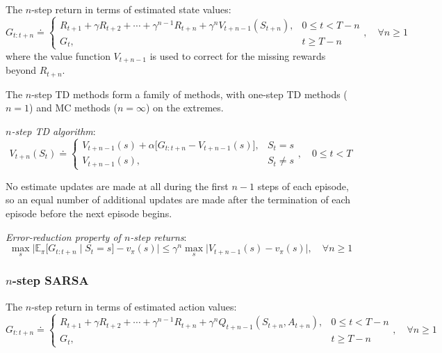 The \( n \)-step return in terms of estimated state values:
\begin{equation}
    G_{t:t+n}
    \doteq
    \begin{cases}
        R_{t+1} + \gamma R_{t+2} + \cdots + \gamma^{n-1} R_{t+n} + \gamma^n V_{t+n-1}(S_{t+n}),
         &
        0 \leq t < T - n
        \\
        G_t,
         &
        t \geq T - n
    \end{cases}
    , \quad \forall n \geq 1
\end{equation}
where the value function \( V_{t+n-1} \) is used to correct for the missing rewards beyond \( R_{t+n} \).

The \( n \)-step TD methods form a family of methods, with one-step TD methods (\( n = 1 \)) and MC methods (\( n = \infty \)) on the extremes.

\textit{\( n \)-step TD algorithm}:
\begin{equation}
    V_{t+n}(S_t)
    \doteq
    \begin{cases}
        V_{t+n-1}(s) + \alpha \Big[ G_{t:t+n} - V_{t+n-1}(s) \Big],
         &
        S_t = s
        \\
        V_{t+n-1}(s),
         &
        S_t \neq s
    \end{cases}
    , \quad 0 \leq t < T
\end{equation}

No estimate updates are made at all during the first \( n-1 \) steps of each episode, so an equal number of additional updates are made after the termination of each episode before the next episode begins.

\textit{Error-reduction property of \( n \)-step returns}:
\begin{equation}
    \max_{s} \Big| \mathbb{E}_{\pi} \big[ G_{t:t+n} \;\big|\; S_t = s \big] - v_\pi(s) \Big|
    \leq
    \gamma^n \max_{s} \Big| V_{t+n-1}(s) - v_\pi(s) \Big|
    , \quad \forall n \geq 1
\end{equation}

\subsubsection{\texorpdfstring{\( n \)}{ (n) }-step SARSA}

The \( n \)-step return in terms of estimated action values:
\begin{equation}
    G_{t:t+n}
    \doteq
    \begin{cases}
        R_{t+1} + \gamma R_{t+2} + \cdots + \gamma^{n-1} R_{t+n} + \gamma^n Q_{t+n-1}(S_{t+n}, A_{t+n}),
         &
        0 \leq t < T - n
        \\
        G_t,
         &
        t \geq T - n
    \end{cases}
    , \quad \forall n \geq 1
\end{equation}

